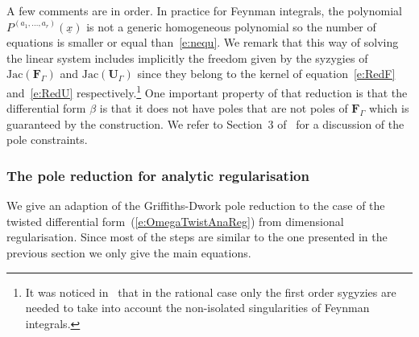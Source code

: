 \documentclass[a4paper,12pt]{article}
\numberwithin{equation}{section}
\numberwithin{figure}{section}
\begin{document}
A few comments are in order. In practice for Feynman integrals,   the polynomial $ P^{(a_1,\dots,a_r)}(\underline x)$ is not a generic
homogeneous polynomial so the number of equations is smaller or equal than~\eqref{e:nequ}.
%
We remark that this way of solving the linear system includes implicitly the
freedom given by the syzygies of $\textrm{Jac}(\textbf{F}_\Gamma)$ and
$\textrm{Jac}(\textbf{U}_\Gamma)$ since they belong to
the kernel of equation~\eqref{e:RedF} and~\eqref{e:RedU}
respectively.\footnote{It was noticed in~\cite{Lairez:2022zkj} that in
  the rational case only the first order sygyzies are needed to take
  into account the non-isolated singularities of Feynman integrals.}
%
%
%
One important property of that reduction is that the differential form $\beta$ is that it
does not have poles that are not poles of $\textbf{F}_\Gamma$ which is
guaranteed by the construction. We refer
to Section~3 of~\cite{Lairez:2022zkj} for a discussion of the pole constraints.
%
%
  \subsubsection{The pole reduction for analytic
    regularisation}\label{sec:PoleRedAn}
We give an adaption of the Griffiths-Dwork pole reduction to the case
of the twisted differential form~(\ref{e:OmegaTwistAnaReg})  from
dimensional regularisation. Since most of the steps are similar to the
one presented in the previous section we only give the main equations.
\end{document}
